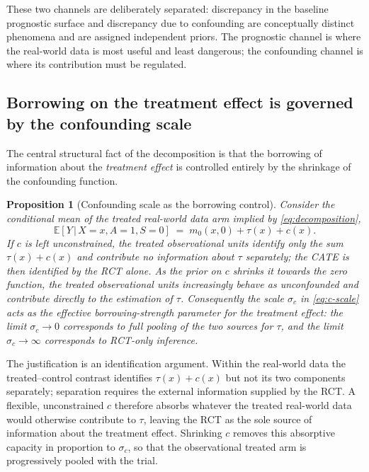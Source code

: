 \documentclass[11pt]{report}
\theoremstyle{plain}
\theoremstyle{definition}
\theoremstyle{remark}
\newcommand{\E}{\mathbb{E}}
\newcommand{\1}{\mathds{1}}
\theoremstyle{plain}
\newtheorem{proposition}[theorem]{Proposition}
\theoremstyle{remark}
\newcommand{\given}{\,\vert\,}
\begin{document}
These two channels are deliberately separated: discrepancy in the baseline
prognostic surface and discrepancy due to confounding are conceptually distinct
phenomena and are assigned independent priors. The prognostic channel is where
the real-world data is most useful and least dangerous; the confounding
channel is where its contribution must be regulated.

\subsection{Borrowing on the treatment effect is governed by the confounding scale}

The central structural fact of the decomposition is that the borrowing of
information about the \emph{treatment effect} is controlled entirely by the
shrinkage of the confounding function.

\begin{proposition}[Confounding scale as the borrowing control]
\label{prop:borrowing}
Consider the conditional mean of the treated real-world data arm implied by
\eqref{eq:decomposition},
\[
\E[Y \given X = x, A = 1, S = 0] \;=\; m_0(x, 0) + \tau(x) + c(x).
\]
If $c$ is left unconstrained, the treated observational units identify only the
sum $\tau(x) + c(x)$ and contribute no information about $\tau$ separately; the
CATE is then identified by the RCT alone. As the prior on $c$ shrinks it
towards the zero function, the treated observational units increasingly behave
as unconfounded and contribute directly to the estimation of $\tau$.
Consequently the scale $\sigma_c$ in \eqref{eq:c-scale} acts as the effective
borrowing-strength parameter for the treatment effect: the limit
$\sigma_c \to 0$ corresponds to full pooling of the two sources for $\tau$,
and the limit $\sigma_c \to \infty$ corresponds to RCT-only inference.
\end{proposition}

\noindent
The justification is an identification argument. Within the real-world data
the treated--control contrast identifies $\tau(x) + c(x)$ but not its two
components separately; separation requires the external information supplied by
the RCT. A flexible, unconstrained $c$ therefore absorbs whatever the treated
real-world data would otherwise contribute to $\tau$, leaving the RCT as the
sole source of information about the treatment effect. Shrinking $c$ removes
this absorptive capacity in proportion to $\sigma_c$, so that the observational
treated arm is progressively pooled with the trial.
\end{document}
